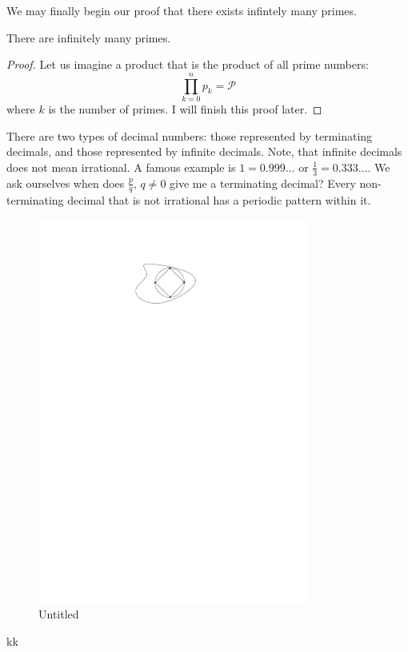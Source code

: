\documentclass[12pt,oneside]{report}
\begin{document}
We may finally begin our proof that there exists infintely many primes.

\begin{theorem}
  There are infinitely many primes. 
  
\end{theorem}


\begin{proof}
  Let us imagine a product that is the product of all prime numbers: 
  \[
    \prod_{k=0}^{n} p_k=\mathcal{P}
  \] 
  where \( k \) is the number of primes. I will finish this proof later. 
\end{proof}

There are two types of decimal numbers: those represented by terminating decimals, and those represented by infinite decimals. Note, that infinite decimals does not mean irrational. A famous example is \( 1=0.999\ldots  \) or \( \frac{1}{3}=0.333\ldots  \). We ask ourselves when does \( \frac{p}{q}, \, q\neq 0\) give me a terminating decimal? Every non-terminating decimal that is not irrational has a periodic pattern within it. 



\begin{figure}[ht]
    \centering
    \includegraphics[width=0.8\textwidth]{./figures/Untitled.pdf}
 \caption{Untitled}
    \label{fig:drawing1}
\end{figure}kk
\end{document}
